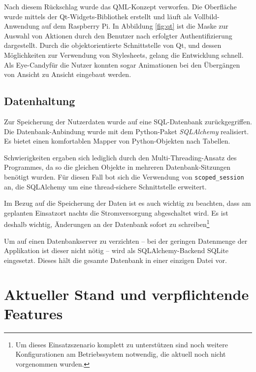 \documentclass[11pt,a4paper]{IEEEtran}
\begin{document}
Nach diesem Rückschlag wurde das QML-Konzept verworfen. Die Oberfläche wurde
mittels der Qt-Widgets-Bibliothek erstellt und läuft als Vollbild-Anwendung 
auf dem Raspberry Pi. In Abbildung \ref{fig:qt} ist die Maske zur Auswahl von
Aktionen durch den Benutzer nach erfolgter Authentifizierung dargestellt. Durch
die objektorientierte Schnittstelle von Qt, und dessen Möglichkeiten zur
Verwendung von Stylesheets, gelang die Entwicklung schnell. Als 
\glqq Eye-Candy\grqq{ }für die Nutzer konnten sogar Animationen bei den Übergängen von Ansicht
zu Ansicht eingebaut werden.

\subsection{Datenhaltung}

Zur Speicherung der Nutzerdaten wurde auf eine SQL-Datenbank zurückgegriffen.
Die Datenbank-Anbindung wurde mit dem Python-Paket
\emph{SQLAlchemy}\autocite{SQLAlchemy} realisiert. Es bietet einen komfortablen
Mapper von Python-Objekten nach Tabellen. 

Schwierigkeiten ergaben sich lediglich durch den Multi-Threading-Ansatz des 
Programmes, da so die gleichen Objekte in mehreren Datenbank-Sitzungen benötigt
wurden. Für diesen Fall bot sich die Verwendung von \texttt{scoped\_session}
an, die SQLAlchemy um eine thread-sichere Schnittstelle erweitert.

Im Bezug auf die Speicherung der Daten ist es auch wichtig zu beachten, dass am
geplanten Einsatzort nachts die Stromversorgung abgeschaltet wird. Es ist 
deshalb wichtig, Änderungen an der Datenbank sofort zu schreiben\footnote{Um
    dieses Einsatzszenario komplett zu unterstützen sind noch weitere
    Konfigurationen am Betriebssystem notwendig, die aktuell noch nicht
vorgenommen wurden.}

Um auf einen Datenbankserver zu verzichten -- bei der geringen Datenmenge der
Applikation ist dieser nicht nötig -- wird als SQLAlchemy-Backend SQLite
eingesetzt. Dieses hält die gesamte Datenbank in einer einzigen Datei vor. 

\section{Aktueller Stand und verpflichtende Features}
\end{document}
